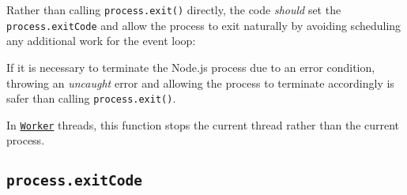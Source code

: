 Rather than calling \texttt{process.exit()} directly, the code
\emph{should} set the \texttt{process.exitCode} and allow the process to
exit naturally by avoiding scheduling any additional work for the event
loop:

\begin{Shaded}
\begin{Highlighting}[]
   \OperatorTok{;}

\NormalTok{ (}\NormalTok{()) \{}
  \NormalTok{()}\OperatorTok{;}
   \OperatorTok{=} \OperatorTok{;}
\NormalTok{\}}
\end{Highlighting}
\end{Shaded}

\begin{Shaded}
\begin{Highlighting}[]
  \OperatorTok{=} \NormalTok{(}\NormalTok{)}\OperatorTok{;}

\NormalTok{ (}\NormalTok{()) \{}
  \NormalTok{()}\OperatorTok{;}
   \OperatorTok{=} \OperatorTok{;}
\NormalTok{\}}
\end{Highlighting}
\end{Shaded}

If it is necessary to terminate the Node.js process due to an error
condition, throwing an \emph{uncaught} error and allowing the process to
terminate accordingly is safer than calling \texttt{process.exit()}.

In \href{worker_threads.md\#class-worker}{\texttt{Worker}} threads, this
function stops the current thread rather than the current process.

\subsection{\texorpdfstring{\texttt{process.exitCode}}{process.exitCode}}\label{process.exitcode-1}

